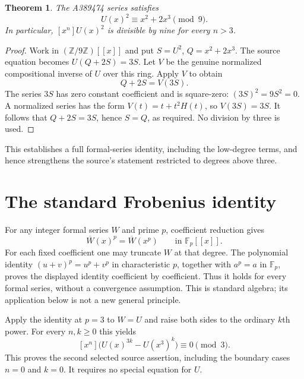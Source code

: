 \documentclass[11pt,a4paper]{article}
\newtheorem{theorem}{Theorem}[section]
\theoremstyle{remark}
\newcommand{\Z}{\mathbb Z}
\newcommand{\F}{\mathbb F}
\begin{document}
\begin{theorem}\label{thm:modnine}
The A389474 series satisfies
\[
U(x)^2\equiv x^2+2x^3\pmod9.
\]
In particular, $[x^n]U(x)^2$ is divisible by nine for every $n>3$.
\end{theorem}

\begin{proof}
Work in $(\Z/9\Z)[[x]]$ and put $S=U^2$, $Q=x^2+2x^3$.
The source equation becomes $U(Q+2S)=3S$. Let $V$ be the genuine
normalized compositional inverse of $U$ over this ring. Apply $V$ to
obtain
\[
Q+2S=V(3S).
\]
The series $3S$ has zero constant coefficient and is square-zero:
$(3S)^2=9S^2=0$. A normalized series has the form
$V(t)=t+t^2H(t)$, so $V(3S)=3S$. It follows that $Q+2S=3S$, hence
$S=Q$, as required. No division by three is used.
\end{proof}

This establishes a full formal-series identity, including the low-degree
terms, and hence strengthens the source's statement restricted to
degrees above three.

\section{The standard Frobenius identity}
For any integer formal series $W$ and prime $p$, coefficient reduction gives
\[
\overline W(x)^p=\overline W(x^p)\qquad\text{in }\F_p[[x]].
\]
For each fixed coefficient one may truncate $W$ at that degree. The
polynomial identity $(u+v)^p=u^p+v^p$ in characteristic $p$, together
with $a^p=a$ in $\F_p$, proves the displayed identity coefficient by
coefficient. Thus it holds for every formal series, without a convergence
assumption. This is standard algebra; its application below is not a new
general principle.

Apply the identity at $p=3$ to $W=U$ and raise both sides to the
ordinary $k$th power. For every $n,k\ge0$ this yields
\[
[x^n]\bigl(U(x)^{3k}-U(x^3)^k\bigr)\equiv0\pmod3.
\]
This proves the second selected source assertion, including the boundary
cases $n=0$ and $k=0$. It requires no special equation for $U$.
\end{document}
